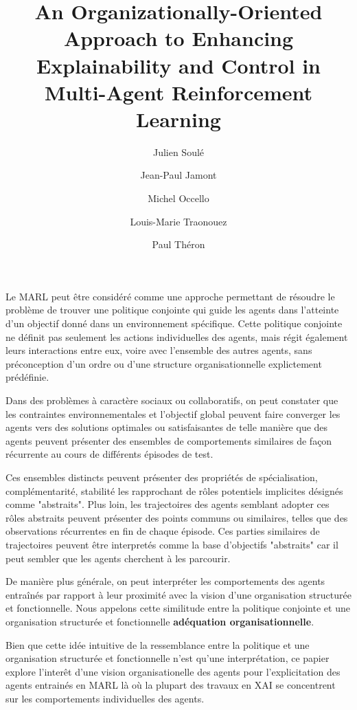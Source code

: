 \documentclass[sigconf,anonymous]{aamas}
\title[AAMAS-2025 CybMASDE]{An Organizationally-Oriented Approach to Enhancing Explainability and Control in Multi-Agent Reinforcement Learning}
\author{Julien Soulé}
\affiliation{
  \institution{Univ. Grenoble Alpes}
  \city{Valence}
  \country{France}}
\author{Jean-Paul Jamont}
\affiliation{
  \institution{Univ. Grenoble Alpes}
  \city{Valence}
  \country{France}}
\author{Michel Occello}
\affiliation{
  \institution{Univ. Grenoble Alpes}
  \city{Valence}
  \country{France}}
\author{Louis-Marie Traonouez}
\affiliation{
  \institution{Thales Land and Air Systems, BU IAS}
  \city{Rennes}
  \country{France}}
\author{Paul Théron}
\affiliation{
  \institution{AICA IWG}
  \city{La Guillermie}
  \country{France}}
\begin{document}

\pagestyle{fancy}
\fancyhead{}


\maketitle


Le MARL peut être considéré comme une approche permettant de résoudre le problème de trouver une politique conjointe qui guide les agents dans l'atteinte d'un objectif donné dans un environnement spécifique.
Cette politique conjointe ne définit pas seulement les actions individuelles des agents, mais régit également leurs interactions entre eux, voire avec l'ensemble des autres agents, sans préconception d'un ordre ou d'une structure organisationnelle explictement prédéfinie.

Dans des problèmes à caractère sociaux ou collaboratifs, on peut constater que les contraintes environnementales et l'objectif global peuvent faire converger les agents vers des solutions optimales ou satisfaisantes de telle manière que des agents peuvent présenter des ensembles de comportements similaires de façon récurrente au cours de différents épisodes de test.

Ces ensembles distincts peuvent présenter des propriétés de spécialisation, complémentarité, stabilité les rapprochant de rôles potentiels implicites désignés comme "abstraits". Plus loin, les trajectoires des agents semblant adopter ces rôles abstraits peuvent présenter des points communs ou similaires, telles que des observations récurrentes en fin de chaque épisode. Ces parties similaires de trajectoires peuvent être interpretés comme la base d'objectifs "abstraits" car il peut sembler que les agents cherchent à les parcourir.

De manière plus générale, on peut interpréter les comportements des agents entraînés par rapport à leur proximité avec la vision d'une organisation structurée et fonctionnelle. Nous appelons cette similitude entre la politique conjointe et une organisation structurée et fonctionnelle \textbf{adéquation organisationnelle}.

Bien que cette idée intuitive de la ressemblance entre la politique et une organisation structurée et fonctionnelle n'est qu'une interprétation, ce papier explore l'interêt d'une vision organisationelle des agents pour l'explicitation des agents entrainés en MARL là où la plupart des travaux en XAI se concentrent sur les comportements individuelles des agents.
\end{document}
